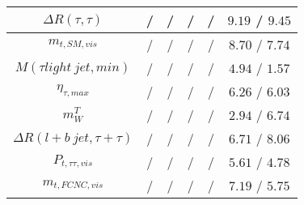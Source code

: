 \begin{tabular}{|c|c|c|c|c|c|}
$\Delta R(\tau ,\tau )$ &  / &  / &  / &  / & $9.19$ / $9.45$\\\hline
$m_{t,SM,vis}$ &  / &  / &  / &  / & $8.70$ / $7.74$\\\hline
$M(\tau  light~jet,min)$ &  / &  / &  / &  / & $4.94$ / $1.57$\\\hline
$\eta_{\tau ,max}$ &  / &  / &  / &  / & $6.26$ / $6.03$\\\hline
$m^{T}_{W}$ &  / &  / &  / &  / & $2.94$ / $6.74$\\\hline
$\Delta R(l+b~jet,\tau +\tau )$ &  / &  / &  / &  / & $6.71$ / $8.06$\\\hline
$P_{t,\tau \tau ,vis}$ &  / &  / &  / &  / & $5.61$ / $4.78$\\\hline
$m_{t,FCNC,vis}$ &  / &  / &  / &  / & $7.19$ / $5.75$\\\hline
\end{tabular}
